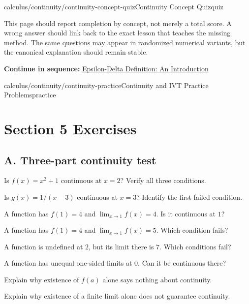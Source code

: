 \documentclass[11pt,openany]{book}
\theoremstyle{bgplain}
\newcommand{\webnext}[2]{%
  \par\addvspace{1.2em}\noindent{\color{BGLine}\rule{\textwidth}{0.35pt}}\par\smallskip
  {\small\color{BGGray}\textbf{Continue in sequence:} \hyperlink{web:#1}{#2}}\par
}
\begin{document}
\begin{webpage}{calculus/continuity/continuity-concept-quiz}{Continuity Concept Quiz}{quiz}
\begin{bgsummary}[title={Quiz use on the website}]
This page should report completion by concept, not merely a total score. A wrong answer should link back to the exact lesson that teaches the missing method. The same questions may appear in randomized numerical variants, but the canonical explanation should remain stable.
\end{bgsummary}
\webnext{calculus/limits/epsilon-delta-introduction}{Epsilon-Delta Definition: An Introduction}
\end{webpage}

\begin{webpage}{calculus/continuity/continuity-practice}{Continuity and IVT Practice Problems}{practice}
\section*{Section 5 Exercises}

\subsection*{A. Three-part continuity test}
\begin{bgexercises}[label=\textbf{5.\arabic*}]
  \item Is \(f(x)=x^2+1\) continuous at \(x=2\)? Verify all three conditions.
  \item Is \(g(x)=1/(x-3)\) continuous at \(x=3\)? Identify the first failed condition.
  \item A function has \(f(1)=4\) and \(\lim_{x\to1}f(x)=4\). Is it continuous at \(1\)?
  \item A function has \(f(1)=4\) and \(\lim_{x\to1}f(x)=5\). Which condition fails?
  \item A function is undefined at \(2\), but its limit there is \(7\). Which conditions fail?
  \item A function has unequal one-sided limits at \(0\). Can it be continuous there?
  \item Explain why existence of \(f(a)\) alone says nothing about continuity.
  \item Explain why existence of a finite limit alone does not guarantee continuity.
\end{bgexercises}


\end{webpage}
\end{document}
